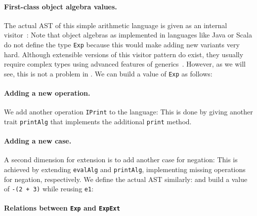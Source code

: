 \paragraph{First-class object algebra values.}

The actual AST of this simple arithmetic language is given as an internal
visitor~\citep{Oliveira_2008}:
Note that object algebras as implemented in languages like Java or Scala do not define the type
\lstinline{Exp} because this would make adding new variants very hard. Although extensible versions
of this visitor pattern do exist, they usually require complex types using advanced features of
generics~\citep{oliveira2012extensibility, togersen:2004}.
However, as we will see, this is not a problem in \sedel. We can build a value of \lstinline{Exp} as follows:


\paragraph{Adding a new operation.}

We add another operation \lstinline{IPrint} to the language:
This is done by giving another trait \lstinline{printAlg} that implements the
additional \lstinline{print} method.


\paragraph{Adding a new case.}

A second dimension for extension is to add another case for negation:
This is achieved by extending \lstinline{evalAlg} and \lstinline{printAlg}, implementing
missing operations for negation, respectively. We define the actual AST similarly:
and build a value of \lstinline{-(2 + 3)} while reusing \lstinline{e1}:

\paragraph{Relations between \lstinline{Exp} and \lstinline{ExpExt}}

